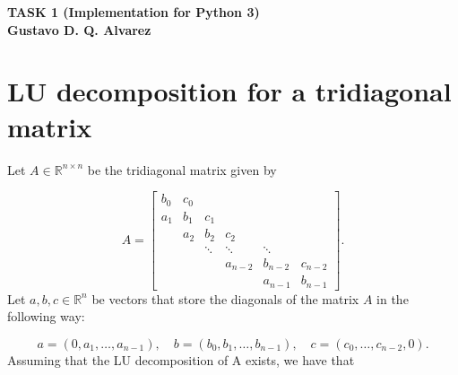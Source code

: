 \documentclass[11pt,a4paper]{report}
\newcommand{\R}{\mathbb{R}}
\begin{document}
\begin{center}
\textbf{TASK 1 (Implementation for Python 3)}\\
\textbf{Gustavo D. Q. Alvarez}
\end{center}

\section*{LU decomposition for a tridiagonal matrix}
Let $A\in\R^{n\times n}$ be the tridiagonal matrix given by 

\begin{equation*}
A = 
\begin{bmatrix}
b_0 & c_0\\
a_1 & b_1 & c_1\\
& a_2 & b_2 & c_2\\
& & \ddots & \ddots & \ddots\\
& & & a_{n-2} & b_{n-2} & c_{n-2} \\
& & & & a_{n-1} & b_{n-1}
\end{bmatrix}.
\end{equation*}
Let $a,b,c\in\R^n$ be vectors that store the diagonals of the matrix $A$ in the following way:

\begin{equation*}
a = (0,a_1,\dots,a_{n-1}),\quad b = (b_0,b_1,\dots,b_{n-1}),\quad c =(c_0,\dots,c_{n-2},0).
\end{equation*}
Assuming that the LU decomposition of A exists, we have that
\end{document}
